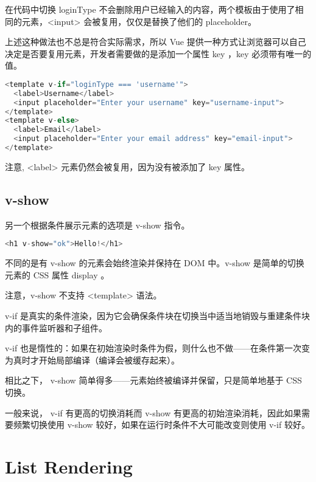 在代码中切换 loginType 不会删除用户已经输入的内容，两个模板由于使用了相同的元素，<input> 会被复用，仅仅是替换了他们的 placeholder。

上述这种做法也不总是符合实际需求，所以 Vue 提供一种方式让浏览器可以自己决定是否要复用元素，开发者需要做的是添加一个属性 key ，key 必须带有唯一的值。

\begin{lstlisting}[language=JavaScript]
<template v-if="loginType === 'username'">
  <label>Username</label>
  <input placeholder="Enter your username" key="username-input">
</template>
<template v-else>
  <label>Email</label>
  <input placeholder="Enter your email address" key="email-input">
</template>
\end{lstlisting}

注意, <label> 元素仍然会被复用，因为没有被添加了 key 属性。


\subsection{v-show}

另一个根据条件展示元素的选项是 v-show 指令。


\begin{lstlisting}[language=JavaScript]
<h1 v-show="ok">Hello!</h1>
\end{lstlisting}

不同的是有 v-show 的元素会始终渲染并保持在 DOM 中。v-show 是简单的切换元素的 CSS 属性 display 。


注意，v-show 不支持 <template> 语法。

\begin{compactitem}
\item v-if 是真实的条件渲染，因为它会确保条件块在切换当中适当地销毁与重建条件块内的事件监听器和子组件。
\item v-if 也是惰性的：如果在初始渲染时条件为假，则什么也不做——在条件第一次变为真时才开始局部编译（编译会被缓存起来）。
\end{compactitem}


相比之下， v-show 简单得多——元素始终被编译并保留，只是简单地基于 CSS 切换。

一般来说， v-if 有更高的切换消耗而 v-show 有更高的初始渲染消耗，因此如果需要频繁切换使用 v-show 较好，如果在运行时条件不大可能改变则使用 v-if 较好。


\section{List Rendering}


